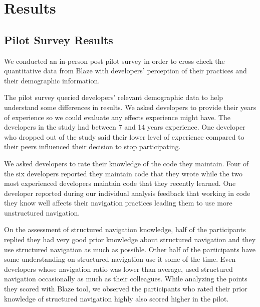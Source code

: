 \documentclass{sig-alternate}
\begin{document}
\section{Results}

\subsection{Pilot Survey Results}

We conducted an in-person post pilot survey in order to cross check the quantitative data from Blaze with developers' perception of their practices and their demographic information.

The pilot survey queried developers' relevant demographic data to help understand some differences in results.  We asked developers to provide their years of experience so we could evaluate any effects experience might have.  The developers in the study had between 7 and 14 years experience.  One developer who dropped out of the study said their lower level of experience compared to their peers influenced their decision to stop participating.  

We asked developers to rate their knowledge of the code they maintain.  Four of the six developers reported they maintain code that they wrote while the two most experienced developers maintain code that they recently learned.  One developer reported during our individual analysis feedback that working in code they know well affects their navigation practices leading them to use more unstructured navigation.

On the assessment of structured navigation knowledge, half of the participants replied they had very good prior knowledge about structured navigation and they use structured navigation as much as possible.  Other half of the participants have some understanding on structured navigation use it some of the time. Even developers whose navigation ratio  was lower than average, used structured navigation occasionally as much as their colleagues.  While analyzing the points they scored with Blaze tool, we observed the participants who rated their prior knowledge of structured navigation highly also scored higher in the pilot. 
\end{document}
